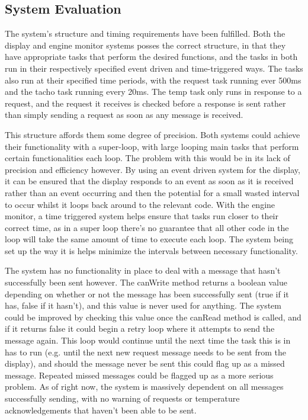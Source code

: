 \documentclass[]{report}
\begin{document}
		\subsection{System Evaluation}
		The system's structure and timing requirements have been fulfilled. Both the display and engine monitor systems posses the correct structure, in that they have appropriate tasks that perform the desired functions, and the tasks in both run in their respectively specified event driven and time-triggered ways. The tasks also run at their specified time periods, with the request task running ever 500ms and the tacho task running every 20ms. The temp task only runs in response to a request, and the request it receives is checked before a response is sent rather than simply sending a request as soon as any message is received.
		
		This structure affords them some degree of precision. Both systems could achieve their functionality with a super-loop, with large looping main tasks that perform certain functionalities each loop. The problem with this would be in its lack of precision and efficiency however. By using an event driven system for the display, it can be ensured that the display responds to an event as soon as it is received rather than an event occurring and then the potential for a small wasted interval to occur whilst it loops back around to the relevant code. With the engine monitor, a time triggered system helps ensure that tasks run closer to their correct time, as in a super loop there's no guarantee that all other code in the loop will take the same amount of time to execute each loop. The system being set up the way it is helps minimize the intervals between necessary functionality.
		
		\medskip
		
		The system has no functionality in place to deal with a message that hasn't successfully been sent however. The canWrite method returns a boolean value depending on whether or not the message has been successfully sent (true if it has, false if it hasn't), and this value is never used for anything. The system could be improved by checking this value once the canRead method is called, and if it returns false it could begin a retry loop where it attempts to send the message again. This loop would continue until the next time the task this is in has to run (e.g. until the next new request message needs to be sent from the display), and should the message never be sent this could flag up as a missed message. Repeated missed messages could be flagged up as a more serious problem. As of right now, the system is massively dependent on all messages successfully sending, with no warning of requests or temperature acknowledgements that haven't been able to be sent.
		
\end{document}
